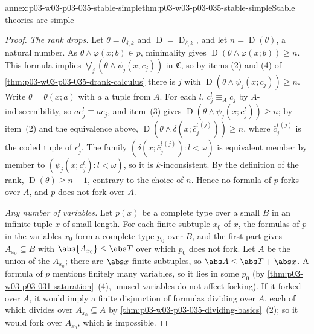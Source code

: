 \begin{annexitem}{annex:p03-w03-p03-035-stable-simple}{thm:p03-w03-p03-035-stable-simple}{Stable theories are simple}
\begin{proof}
\emph{The rank drops.}  Let \(\theta=\theta_{\delta,k}\) and
\(\operatorname D=\operatorname D_{\delta,k}\), and let \(n=\operatorname
D(\theta)\), a natural number.  As \(\theta\wedge\varphi(x;b)\in p\),
minimality gives \(\operatorname D(\theta\wedge\varphi(x;b))\geq n\).  This
formula implies \(\bigvee_j(\theta\wedge\psi_j(x;c_j))\) in \(\mathfrak C\),
so by items (2) and (4) of \cref{thm:p03-w03-p03-035-drank-calculus} there
is \(j\) with \(\operatorname D(\theta\wedge\psi_j(x;c_j))\geq n\).  Write
\(\theta=\theta(x;a)\) with \(a\) a tuple from \(A\).  For each \(l\),
\(c^l_j\equiv_A c_j\) by \(A\)-indiscernibility, so \(ac^l_j\equiv ac_j\),
and item~(3) gives \(\operatorname D(\theta\wedge\psi_j(x;c^l_j))\geq n\);
by item~(2) and the equivalence above,
\(\operatorname D(\theta\wedge\delta(x;\hat{c}^{l\,(j)}_j))\geq n\), where
\(\hat c^{l\,(j)}_j\) is the coded tuple of \(c^l_j\).  The family
\((\delta(x;\hat c^{l\,(j)}_j):l<\omega)\) is equivalent member by member to
\((\psi_j(x;c^l_j):l<\omega)\), so it is \(k\)-inconsistent.  By the
definition of the rank, \(\operatorname D(\theta)\geq n+1\), contrary to the
choice of \(n\).  Hence no formula of \(p\) forks over \(A\), and \(p\) does
not fork over \(A\).

\emph{Any number of variables.}  Let \(p(x)\) be a complete type over a small
\(B\) in an infinite tuple \(x\) of small length.  For each finite subtuple
\(x_0\) of \(x\), the formulas of \(p\) in the variables \(x_0\) form a
complete type \(p_0\) over \(B\), and the first part gives
\(A_{x_0}\subseteq B\) with \(\abs{A_{x_0}}\leq\abs T\) over which \(p_0\)
does not fork.  Let \(A\) be the union of the \(A_{x_0}\); there are
\(\abs x\) finite subtuples, so \(\abs A\leq\abs T+\abs x\).  A formula of
\(p\) mentions finitely many variables, so it lies in some \(p_0\) (by
\cref{thm:p03-w03-p03-031-saturation}~(4), unused variables do not affect
forking).  If it forked over \(A\), it would imply a finite disjunction of
formulas dividing over \(A\), each of which divides over
\(A_{x_0}\subseteq A\) by \cref{thm:p03-w03-p03-035-dividing-basics}~(2);
so it would fork over \(A_{x_0}\), which is impossible.


\end{proof}
\end{annexitem}

